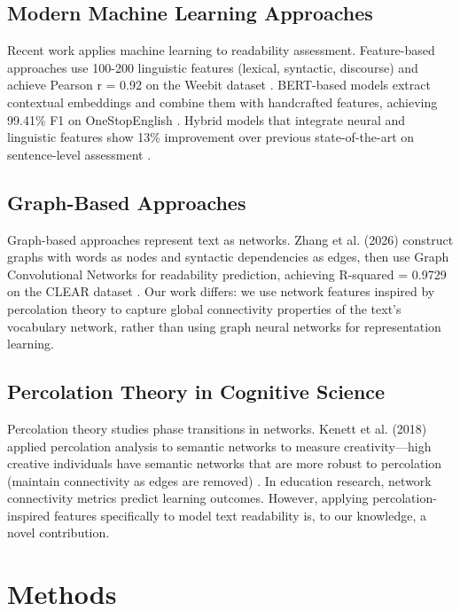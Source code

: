 \documentclass[11pt,letterpaper]{article}
\begin{document}
\subsection{Modern Machine Learning Approaches}

Recent work applies machine learning to readability assessment. Feature-based approaches use 100-200 linguistic features (lexical, syntactic, discourse) and achieve Pearson r = 0.92 on the Weebit dataset \cite{Vajjala2013}. BERT-based models extract contextual embeddings and combine them with handcrafted features, achieving 99.41\% F1 on OneStopEnglish \cite{Li2022}. Hybrid models that integrate neural and linguistic features show 13\% improvement over previous state-of-the-art on sentence-level assessment \cite{Liu2023}.

\subsection{Graph-Based Approaches}

Graph-based approaches represent text as networks. Zhang et al. (2026) construct graphs with words as nodes and syntactic dependencies as edges, then use Graph Convolutional Networks for readability prediction, achieving R-squared = 0.9729 on the CLEAR dataset \cite{Zhang2026}. Our work differs: we use network features inspired by percolation theory to capture global connectivity properties of the text's vocabulary network, rather than using graph neural networks for representation learning.

\subsection{Percolation Theory in Cognitive Science}

Percolation theory studies phase transitions in networks. Kenett et al. (2018) applied percolation analysis to semantic networks to measure creativity---high creative individuals have semantic networks that are more robust to percolation (maintain connectivity as edges are removed) \cite{Kenett2018}. In education research, network connectivity metrics predict learning outcomes. However, applying percolation-inspired features specifically to model text readability is, to our knowledge, a novel contribution.

\section{Methods}
\end{document}
